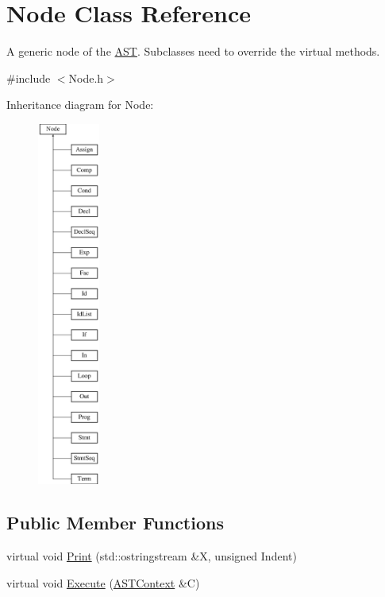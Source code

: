 \hypertarget{class_node}{}\section{Node Class Reference}
\label{class_node}


A generic node of the \mbox{\hyperlink{class_a_s_t}{A\+ST}}. Subclasses need to override the virtual methods.  




{\ttfamily \#include $<$Node.\+h$>$}

Inheritance diagram for Node\+:\begin{figure}[H]
\begin{center}
\leavevmode
\includegraphics[height=12.000000cm]{class_node}
\end{center}
\end{figure}
\subsection*{Public Member Functions}
\begin{DoxyCompactItemize}
\item 
virtual void \mbox{\hyperlink{class_node_a5325b760a6e6fe94227c0cff53af2c45}{Print}} (std\+::ostringstream \&X, unsigned Indent)
\item 
virtual void \mbox{\hyperlink{class_node_a27ad1ba81d2596817b361368282bcbfa}{Execute}} (\mbox{\hyperlink{class_a_s_t_context}{A\+S\+T\+Context}} \&C)
\end{DoxyCompactItemize}


